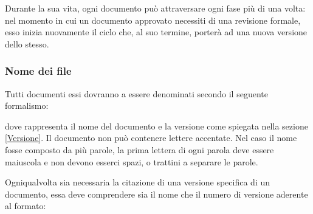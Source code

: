 \documentclass[12pt,a4paper]{article}
\begin{document}
Durante la sua vita, ogni documento può attraversare ogni fase più di una volta: nel momento in cui un documento approvato necessiti di una revisione formale, esso inizia nuovamente il ciclo che, al suo termine, porterà ad una nuova versione dello stesso.

\subsubsection{Nome dei file}

Tutti documenti essi dovranno a essere denominati secondo il seguente formalismo:
\begin{center}
\end{center}
dove  rappresenta il nome del documento e  la versione come spiegata nella sezione \ref{Versione}. Il documento non può contenere lettere accentate. Nel caso il nome fosse composto da più parole, la prima lettera di ogni parola deve essere maiuscola e non devono esserci spazi,  o trattini a separare le parole.

Ogniqualvolta sia necessaria la citazione di una versione specifica di un documento, essa deve comprendere sia il nome che il numero di versione aderente al formato:
\begin{center}
\end{center}
\end{document}
